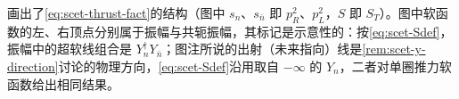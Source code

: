 画出了\cref{eq:scet-thrust-fact}的结构（图中 $s_n$、$s_{\bar n}$ 即 $p_R^2$、$p_L^2$，$S$ 即 $S_T$）。图中软函数的左、右顶点分别属于振幅与共轭振幅，其标记是示意性的：按\cref{eq:scet-Sdef}，振幅中的超软线组合是 $Y_n^\dagger Y_{\bar n}$；图注所说的出射（未来指向）线是\cref{rem:scet-y-direction}讨论的物理方向，\cref{eq:scet-Sdef}沿用取自 $-\infty$ 的 $Y_n$，二者对单圈推力软函数给出相同结果。

